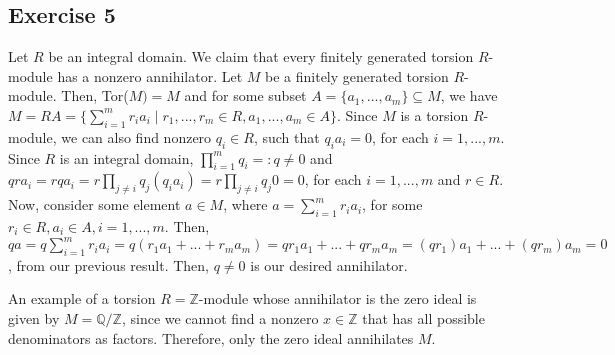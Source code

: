 \subsection*{Exercise 5}
Let $R$ be an integral domain. We claim that every finitely generated torsion $R$-module has a nonzero annihilator. Let $M$ be a finitely generated torsion $R$-module. Then, Tor($M) = M$ and for some subset $A = \{a_1,...,a_m\} \subseteq M$, we have $M = RA = \{\sum_{i=1}^m r_ia_i \mid r_1,...,r_m \in R, a_1,...,a_m \in A\}$. Since $M$ is a torsion $R$-module, we can also find nonzero $q_i \in R$, such that $q_ia_i = 0$, for each $i = 1,...,m$. Since $R$ is an integral domain, $\prod_{i=1}^m q_i =: q \not= 0$ and $qra_i = rqa_i = r\prod_{j\not=i}q_j(q_ia_i) = r\prod_{j\not=i}q_j0 = 0$, for each $i = 1,...,m$ and $r \in R$. Now, consider some element $a \in M$, where $a = \sum_{i=1}^mr_ia_i$, for some $r_i \in R, a_i \in A, i=1,...,m$. Then, $qa = q\sum_{i=1}^mr_ia_i = q(r_1a_1 + ... + r_ma_m) = qr_1a_1 + ... + qr_ma_m = (qr_1)a_1 + ... + (qr_m)a_m = 0$, from our previous result. Then, $q \not=0$ is our desired annihilator.

An example of a torsion $R=\mathbb{Z}$-module whose annihilator is the zero ideal is given by $M = \mathbb{Q}/\mathbb{Z}$, since we cannot find a nonzero $x \in \mathbb{Z}$ that has all possible denominators as factors. Therefore, only the zero ideal annihilates $M$.